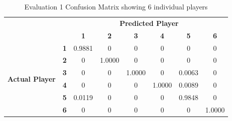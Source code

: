\documentclass{article}
\begin{document}
{{{\begin{table}[t!]
\begin{centering}
\textwidth
\begin{minipage}{0.4\textwidth}
\begin{tabular}{cc|c|c|c|c|c|c|}
\cline{3-8}
\multicolumn{1}{l}{}                                          & \multicolumn{1}{l|}{} & \multicolumn{6}{c|}{\textbf{Predicted Player}}                              \\ \cline{3-8} 
\multicolumn{1}{l}{}                                          & \multicolumn{1}{l|}{} & \textbf{1} & \textbf{2} & \textbf{3} & \textbf{4} & \textbf{5} & \textbf{6} \\ \hline
\multicolumn{1}{|c|}{\multirow{6}{*}{\begin{turn}{90}\textbf{Actual Player}\end{turn}}} & \textbf{1}            & 0.9881     & 0          & 0          & 0          & 0          & 0          \\ \cline{2-8} 
\multicolumn{1}{|c|}{}                                        & \textbf{2}            & 0          & 1.0000     & 0          & 0          & 0          & 0          \\ \cline{2-8} 
\multicolumn{1}{|c|}{}                                        & \textbf{3}            & 0          & 0          & 1.0000     & 0          & 0.0063     & 0          \\ \cline{2-8} 
\multicolumn{1}{|c|}{}                                        & \textbf{4}            & 0          & 0          & 0          & 1.0000     & 0.0089     & 0          \\ \cline{2-8} 
\multicolumn{1}{|c|}{}                                        & \textbf{5}            & 0.0119     & 0          & 0          & 0          & 0.9848     & 0          \\ \cline{2-8} 
\multicolumn{1}{|c|}{}                                        & \textbf{6}            & 0          & 0          & 0          & 0          & 0          & 1.0000     \\ \hline
\end{tabular}

\caption{Evaluation 1 Confusion Matrix showing 6 individual players}

\end{minipage}%

\hfill




\end{centering}
\end{table}}}}
\end{document}
